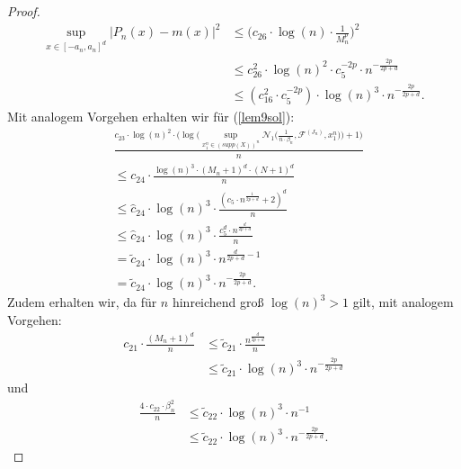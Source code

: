 \begin{proof}
\begin{equation}
\begin{split}
\sup_{x \in [-a_n, a_n]^d} |P_n(x) - m(x)|^2 & \leq \bigg(c_{26} \cdot \log(n) \cdot \frac{1}{M_n^p}\bigg)^2 \\
& \leq c_{26}^2 \cdot \log(n)^2 \cdot c_{5}^{-2p} \cdot n^{-\frac{2p}{2p + d}} \\
& \leq (c_{16}^2 \cdot c_{5}^{-2p}) \cdot \log(n)^3 \cdot n^{-\frac{2p}{2p + d}}.
\end{split}
\end{equation}
Mit analogem Vorgehen erhalten wir für (\ref{lem9sol}):
\begin{equation}
\begin{split}
& \frac{c_{23} \cdot \log(n)^2 \cdot \big(\log\big(\sup_{x_1^n \in (supp(X))^n}\mathcal{N}_1\big(\frac{1}{n \cdot \beta_n},\mathcal{F}^{(J_n)},x_1^n\big)\big) + 1\big)}{n} \\
& \leq c_{24} \cdot \frac{\log(n)^3 \cdot (M_n + 1)^d \cdot (N + 1)^d}{n} \\
& \leq \hat{c}_{24} \cdot \log(n)^3 \cdot \frac{(c_5 \cdot n^{\frac{1}{2p + d}} + 2)^d}{n} \\
& \leq \hat{c}_{24} \cdot \log(n)^3 \cdot \frac{c_5^d\cdot n^{\frac{d}{2p + d}}}{n} \\
& = \tilde{c}_{24} \cdot \log(n)^3 \cdot n^{\frac{d}{2p + d} - 1} \\
& = \tilde{c}_{24} \cdot \log(n)^3 \cdot n^{-\frac{2p}{2p + d}}.
\end{split}
\end{equation}
Zudem erhalten wir, da für $n$ hinreichend groß $\log(n)^3 > 1$ gilt, mit analogem Vorgehen:
\begin{equation*}
\begin{split}
c_{21} \cdot \frac{(M_n + 1)^d}{n} & \leq \tilde{c}_{21} \cdot \frac{n^{\frac{d}{2p + d}}}{n} \\
& \leq \tilde{c}_{21} \cdot \log(n)^3 \cdot n^{- \frac{2p}{2p + d}} 
\end{split}
\end{equation*} 
und 
\begin{equation*}
\begin{split}
\frac{4 \cdot c_{22} \cdot \beta_n^2}{n} & \leq \tilde{c}_{22} \cdot \log(n)^3 \cdot n^{-1} \\
& \leq \tilde{c}_{22} \cdot \log(n)^3 \cdot n^{- \frac{2p}{2p + d}}.  
\end{split}
\end{equation*} 
\end{proof}
